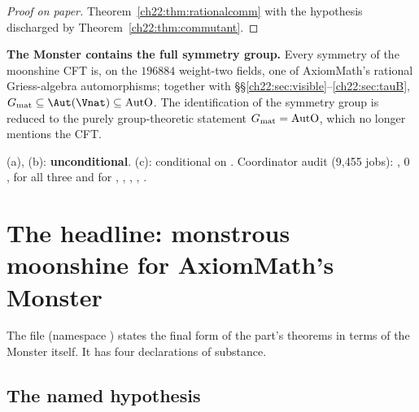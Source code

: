 \begin{proof}[Proof on paper]
Theorem~\ref{ch22:thm:rationalcomm} with the hypothesis discharged by Theorem~\ref{ch22:thm:commutant}.
\end{proof}
\begin{physics}
\textbf{The Monster contains the full symmetry group.}  Every symmetry of the moonshine CFT is, on the $196884$ weight-two
fields, one of AxiomMath's rational Griess-algebra automorphisms; together with \S\S\ref{ch22:sec:visible}--\ref{ch22:sec:tauB},
$\chtwentytwoGmat\subseteq\Aut(\Vnat)\subseteq\chtwentytwoAutO$.  The identification of the symmetry group is reduced to
the purely group-theoretic statement $G_{\mathrm{mat}}=\mathrm{AutO}$, which no longer mentions the CFT.
\end{physics}
\begin{status}
(a), (b): \textbf{unconditional}.  (c): conditional on .  Coordinator audit
 (9,455 jobs): ,
$0$ , for all three and for , ,
, , .
\end{status}


\section{The headline: monstrous moonshine for AxiomMath's Monster}\label{ch22:sec:headline}

The file  (namespace ) states the
final form of the part's theorems in terms of the Monster itself.  It has four declarations of substance.

\subsection{The named hypothesis}

